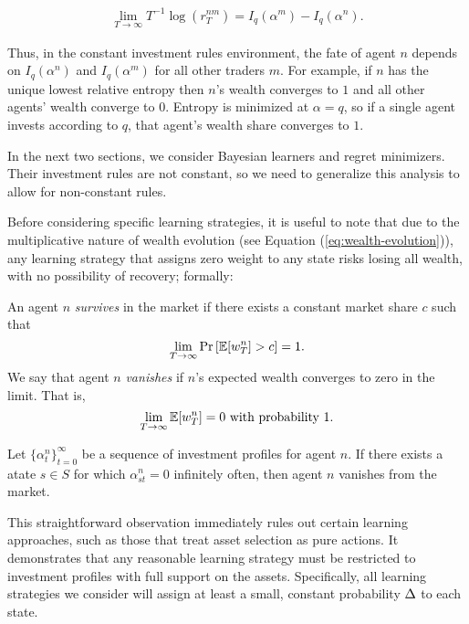 \begin{align}
\label{eq:fixed invext entropy}
    \lim_{T\to \infty} T^{-1} \log(r^{nm}_{T}) = I_q(\alpha^m) - I_q(\alpha^n). 
\end{align}

Thus, in the constant investment rules environment, the fate of agent $n$ depends on $I_q(\alpha^n)$ and $I_q(\alpha^m)$ for all other traders $m$. For example, if $n$ has the unique lowest relative entropy then $n$'s wealth converges to $1$ and all other agents' wealth converge to $0$. Entropy is minimized at $\alpha=q$, so if a single agent invests according to $q$, that agent's wealth share converges to $1$.

In the next two sections, we consider Bayesian learners and regret minimizers. Their investment rules are not constant, so we need to generalize this analysis to allow for non-constant rules. 

Before considering specific learning strategies, it is useful to note that due to the multiplicative nature of wealth evolution (see Equation (\ref{eq:wealth-evolution})), any learning strategy that assigns zero weight to any state risks losing all wealth, with no possibility of recovery; formally:
\begin{definition}\label{def:survive-and-vanish}
    An agent $n$ {\em survives} in the market if there exists a constant market share $c$ such that 
    $$
    \lim_{T \rightarrow \infty} \Pr\left[
    \operatorname{\mathbb{E}}[w^n_T] > c\right] = 1.
    $$
    We say that agent $n$ {\em vanishes} if $n$'s expected wealth converges to zero in the limit. That is, 
    $$
    \lim_{T \rightarrow \infty} 
    \operatorname{\mathbb{E}}[w^n_T]  = 0 \text{ with probability } 1.
    $$
\end{definition}

\begin{observation}
    Let $\{\alpha^n_t\}_{t=0}^\infty$ be a sequence of investment profiles for agent $n$. If there exists a atate $s \in S$ for which $\alpha^n_{st} = 0$ infinitely often, then agent $n$ vanishes from the market.
\end{observation}

This straightforward observation immediately rules out certain learning approaches, such as those that treat asset selection as pure actions. It demonstrates that any reasonable learning strategy must be restricted to investment profiles with full support on the assets. Specifically, all learning strategies we consider will assign at least a small, constant probability $\Delta$ to each state.
